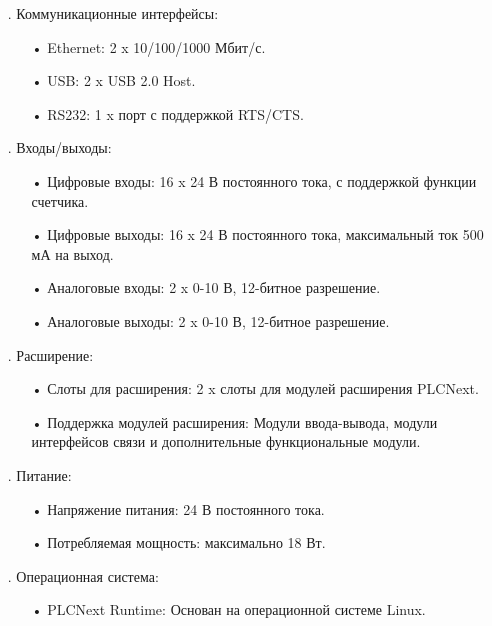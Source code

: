 {\begin{itemize}[leftmargin=2.15cm, labelwidth=0.65cm, labelsep=0.0cm]
		\item[\theitemcntr. ] Коммуникационные интерфейсы:
			\begin{itemize}[leftmargin=1.5cm, labelwidth=0.65cm, labelsep=0.0cm] 
				\item[•] Ethernet: 2 x 10/100/1000 Мбит/с.
				\item[•] USB: 2 x USB 2.0 Host.
				\item[•] RS232: 1 x порт с поддержкой RTS/CTS.
			\end{itemize} \addtocounter{itemcntr}{1}

		\item[\theitemcntr. ] Входы/выходы:
			\begin{itemize}[leftmargin=1.5cm, labelwidth=0.65cm, labelsep=0.0cm] 
				\item[•] Цифровые входы: 16 x 24 В постоянного тока, с поддержкой функции счетчика.
				\item[•] Цифровые выходы: 16 x 24 В постоянного тока, максимальный ток 500 мА на выход.
				\item[•] Аналоговые входы: 2 x 0-10 В, 12-битное разрешение.
				\item[•] Аналоговые выходы: 2 x 0-10 В, 12-битное разрешение.
			\end{itemize} \addtocounter{itemcntr}{1}

		\item[\theitemcntr. ] Расширение:
			\begin{itemize}[leftmargin=1.5cm, labelwidth=0.65cm, labelsep=0.0cm] 
				\item[•] Слоты для расширения: 2 x слоты для модулей расширения PLCNext.
				\item[•] Поддержка модулей расширения: Модули ввода-вывода, модули интерфейсов связи и дополнительные функциональные модули.
			\end{itemize} \addtocounter{itemcntr}{1}

		\item[\theitemcntr. ] Питание:
			\begin{itemize}[leftmargin=1.5cm, labelwidth=0.65cm, labelsep=0.0cm] 
				\item[•] Напряжение питания: 24 В постоянного тока.
				\item[•] Потребляемая мощность: максимально 18 Вт.
		    \end{itemize} \addtocounter{itemcntr}{1}

		\item[\theitemcntr. ] Операционная система:
			\begin{itemize}[leftmargin=1.5cm, labelwidth=0.65cm, labelsep=0.0cm] 
				\item[•] PLCNext Runtime: Основан на операционной системе Linux.
			\end{itemize} \addtocounter{itemcntr}{1}


\end{itemize}}
